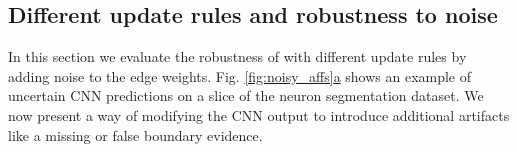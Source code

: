 



\subsection{Different update rules and robustness to noise}
 In this section we evaluate the robustness of \algname{} with different update rules by adding noise to the edge weights.
Fig. \hyperref[fig:noisy_affs]{\ref*{fig:noisy_affs}a} shows an example of uncertain CNN predictions on a slice of the neuron segmentation dataset. We now present a way of modifying the CNN output to introduce additional artifacts like a missing or false boundary evidence. 

